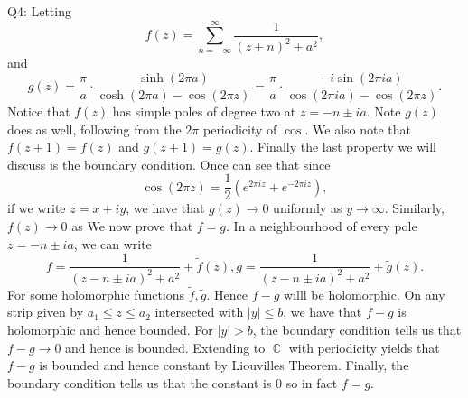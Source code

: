 \documentclass[letterpaper]{article}
\DeclareMathOperator{\C}{\mathbb{C}}
\begin{document}
 \noindent  Q4: Letting $$f(z) = \sum_{n= -\infty}^{\infty} \frac{1}{(z+n)^2+a^2},$$ and 
$$g(z) = \frac{\pi}{a} \cdot \frac{\sinh(2\pi a)}{\cosh(2\pi a) - \cos(2\pi z)} = \frac{\pi}{a} \cdot \frac{-i\sin(2\pi i a)}{\cos(2\pi i a) - \cos(2\pi z)}.$$
Notice that $f(z)$ has simple poles of degree two at $z = -n \pm ia$. Note $g(z)$ does as well, following from the $2\pi$ periodicity of $\cos$. We also note that
$f(z+1)=f(z)$ and $g(z+1)=g(z)$. Finally the last property we will discuss is the boundary condition. Once can see that since $$\cos(2\pi z) = \frac{1}{2}(e^{2\pi i z} + e^{-2\pi i z} ),$$ 
if we write $z = x+iy$, we have that $g(z)\to 0$ uniformly as $y\to \infty$. Similarly, $f(z)\to 0$ as  We now prove that $f=g$. In a neighbourhood of every pole $z = -n\pm ia$, 
we can write $$f = \frac{1}{(z - n \pm ia)^2 +a^2} + \tilde{f}(z), g = \frac{1}{(z - n \pm ia)^2 +a^2} + \tilde{g}(z).$$ 
For some holomorphic functions $\tilde{f},\tilde{g}$. Hence $f-g$ willl be holomorphic. On any strip given by $a_1 \leq z \leq a_2$ intersected with $|y|\leq b$, we have that $f-g$ is 
holomorphic and hence bounded. For $|y|>b$, the boundary condition tells us that $f-g\to 0$ and hence is bounded. Extending to $\C$ with periodicity yields 
that $f-g$ is bounded and hence constant by Liouvilles Theorem. Finally, the boundary condition tells us that the constant is $0$ so in fact $f=g$. 
\end{document}
